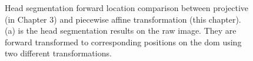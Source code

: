 \begin{figure}[htb!]
  \begin{center}
  \end{center}
  \caption[Head segmentation forward location comparison between projective and piecewise affine transformation]{
    Head segmentation forward location comparison between projective (in Chapter 3) and piecewise affine transformation (this chapter). (a) is the head segmentation results on the raw image. They are forward transformed to corresponding positions on the \gls{dom} using two different transformations.
  }
  \label{fig:xrs3}
\end{figure}